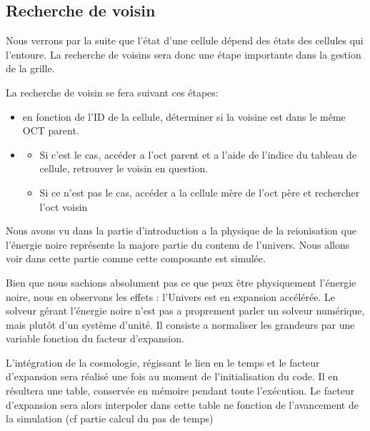 \subsection{Recherche de voisin}
Nous verrons par la suite que l'état d'une cellule dépend des états des cellules qui l'entoure.
La recherche de voisins sera donc une étape importante dans la gestion de la grille.

La recherche de voisin se fera suivant ces étapes:

\begin{itemize}
\item en fonction de l'ID de la cellule, déterminer si la voisine est dans le même OCT parent.


\item
\begin{itemize}
\item Si c'est le cas, accéder a l'oct parent et a l'aide de l'indice du tableau de cellule, retrouver le voisin en question.
\item Si ce n'est pas le cas, accéder a la cellule mère de l'oct père et rechercher l'oct voisin
\end{itemize}

\end{itemize}


Nous avons vu dans la partie d'introduction a la physique de la reionisation que l'énergie noire représente la majore partie du contenu de l'univers.
Nous allons voir dans cette partie comme cette composante est simulée.

Bien que nous sachions absolument pas ce que peux être physiquement l'énergie noire, nous en observons les effets : l'Univers est en expansion accélérée.
Le solveur gérant l'énergie noire n'est pas a proprement parler un solveur numérique, mais plutôt d'un système d'unité. %
Il consiste a normaliser les grandeurs par une variable fonction du facteur d'expansion.


L'intégration de la cosmologie, régissant le lien en le temps et le facteur d'expansion sera réalisé une fois au moment de l'initialisation du code. %
Il en résultera une table, conservée en mémoire pendant toute l'exécution.
Le facteur d'expansion sera alors interpoler dans cette table ne fonction de l'avancement de la simulation (cf partie calcul du pas de temps) %

